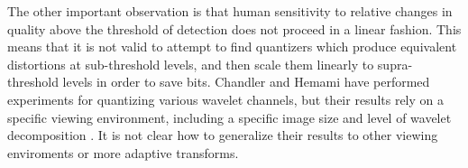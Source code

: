 \documentclass[11pt,letterpaper]{article}
\begin{document}
The other important observation is that human sensitivity to relative changes
 in quality above the threshold of detection does not proceed in a linear
 fashion.
This means that it is not valid to attempt to find quantizers which produce
 equivalent distortions at sub-threshold levels, and then scale them linearly
 to supra-threshold levels in order to save bits.
Chandler and Hemami have performed experiments for quantizing various wavelet
 channels, but their results rely on a specific viewing environment, including
 a specific image size and level of wavelet decomposition \cite{CH02b}.
It is not clear how to generalize their results to other viewing enviroments or
 more adaptive transforms.



\end{document}
